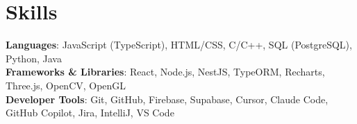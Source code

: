 \documentclass[letterpaper,11pt]{article}
\begin{document}
\section{Skills}
 \begin{itemize}[leftmargin=0.15in, label={}]
    \small{\item{
     \textbf{Languages}{: JavaScript (TypeScript), HTML/CSS, C/C++, SQL (PostgreSQL), Python, Java} \\
    \textbf{Frameworks \& Libraries}{: React, Node.js, NestJS, TypeORM, Recharts, Three.js, OpenCV, OpenGL} \\
    \textbf{Developer Tools}{: Git, GitHub, Firebase, Supabase, Cursor, Claude Code, GitHub Copilot, Jira, IntelliJ, VS Code} \\
    }}
 \end{itemize}

\end{document}
